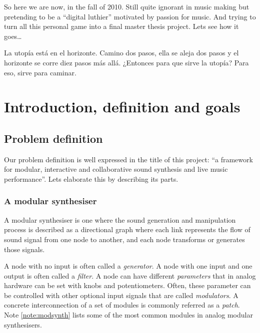 So here we are now, in the fall of 2010. Still quite ignorant in music
making but pretending to be a ``digital luthier'' motivated by passion
for music. And trying to turn all this personal game into a final
master thesis project. Lets see how it goes\ldots


\begin{savequote}[10pc]
  \sffamily La utopía está en el horizonte. Camino dos pasos, ella se
  aleja dos pasos y el horizonte se corre diez pasos más
  allá. ¿Entonces para que sirve la utopía? Para eso, sirve para
  caminar.
\end{savequote}

\chapter{Introduction, definition and goals}

\section{Problem definition}

Our problem definition is well expressed in the title of this project:
``a framework for modular, interactive and collaborative sound
synthesis and live music performance''. Lets elaborate this by
describing its parts.

\subsection{A modular synthesiser}
\label{sec:defmodular}
A modular synthesiser is one where the sound generation and
manipulation process is described as a directional graph where each
link represents the flow of sound signal from one node to another, and
each node transforms or generates those signals.

A node with no input is often called a \emph{generator}. A node with
one input and one output is often called a \emph{filter}. A node can
have different \emph{parameters} that in analog hardware can be set
with knobs and potentiometers. Often, these parameter can be
controlled with other optional input signals that are called
\emph{modulators}. A concrete interconnection of a set of modules is
commonly referred as a \emph{patch}. Note \ref{note:modsynth} lists
some of the most common modules in analog modular synthesisers.

